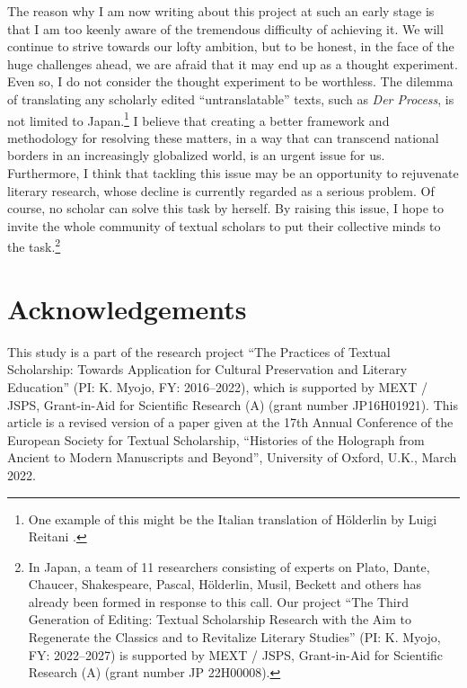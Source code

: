 \documentclass{article}
\begin{document}
The reason why I am now writing about this project at such an early
stage is that I am too keenly aware of the tremendous difficulty of
achieving it. We will continue to strive towards our lofty ambition, but
to be honest, in the face of the huge challenges ahead, we are afraid
that it may end up as a thought experiment. Even so, I do not
consider the thought experiment to be worthless. The dilemma of
translating any scholarly edited ``untranslatable'' texts, such as
\emph{Der Process}, is not limited to Japan.\footnote{One example of this
  might be the Italian translation of Hölderlin by Luigi Reitani
  \citep{holderlin_tutte_2001}.} I believe that creating a better framework and methodology for resolving these
matters, in a way that can transcend national borders in an increasingly
globalized world, is an urgent issue for us. Furthermore, I think that tackling this issue may be
an opportunity to rejuvenate literary research, whose decline is currently
regarded as a serious problem. Of course, no scholar can solve
this task by herself. By raising this issue, I hope to invite the whole
community of textual scholars to put their collective minds to the
task.\footnote{In Japan, a team of 11 researchers consisting of experts
  on Plato, Dante, Chaucer, Shakespeare, Pascal, Hölderlin, Musil,
  Beckett and others has already been formed in response to this call.
  Our project ``The Third Generation of Editing: Textual Scholarship
  Research with the Aim to Regenerate the Classics and to Revitalize
  Literary Studies'' (PI: K. Myojo, FY: 2022--2027) is supported by MEXT
  / JSPS, Grant-in-Aid for Scientific Research (A) (grant number JP
  22H00008).}

\section*{Acknowledgements} This study is a part of the research project
``The Practices of Textual Scholarship: Towards Application for Cultural
Preservation and Literary Education'' (PI: K. Myojo, FY: 2016--2022),
which is supported by MEXT / JSPS, Grant-in-Aid for Scientific Research
(A) (grant number JP16H01921). This article is a revised version of a paper given at the 17th Annual Conference of the European Society for Textual Scholarship, ``Histories of the Holograph from Ancient to Modern Manuscripts and Beyond'', University of Oxford, U.K., March 2022.

\begin{flushleft}
    \renewcommand*{\mkbibnamefamily}[1]{\textsc{#1}}
    \renewcommand*{\mkbibnamegiven}[1]{\textsc{#1}} 
\printbibliography
\end{flushleft}
\end{document}
